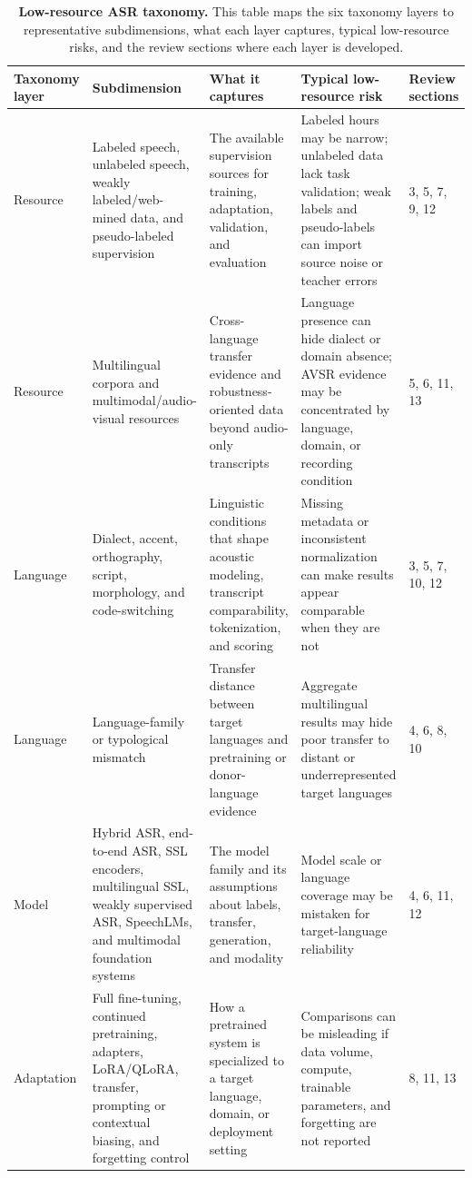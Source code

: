 \documentclass[pdflatex,sn-basic,iicol]{sn-jnl}
\theoremstyle{thmstyleone}
\theoremstyle{thmstyletwo}
\theoremstyle{thmstylethree}
\begin{document}
\begin{table}[htbp]
\setcounter{table}{0}
\small
\centering
\caption{\textbf{Low-resource ASR taxonomy.} This table maps the six taxonomy layers to representative subdimensions, what each layer captures, typical low-resource risks, and the review sections where each layer is developed.}
\label{tab:1}
\begin{tabularx}{\textwidth}{YYYYY}
\toprule
\textbf{Taxonomy layer} & \textbf{Subdimension} & \textbf{What it captures} & \textbf{Typical low-resource risk} & \textbf{Review sections} \\
\midrule
Resource & Labeled speech, unlabeled speech, weakly labeled/web-mined data, and pseudo-labeled supervision & The available supervision sources for training, adaptation, validation, and evaluation & Labeled hours may be narrow; unlabeled data lack task validation; weak labels and pseudo-labels can import source noise or teacher errors & 3, 5, 7, 9, 12 \\
Resource & Multilingual corpora and multimodal/audio-visual resources & Cross-language transfer evidence and robustness-oriented data beyond audio-only transcripts & Language presence can hide dialect or domain absence; AVSR evidence may be concentrated by language, domain, or recording condition & 5, 6, 11, 13 \\
Language & Dialect, accent, orthography, script, morphology, and code-switching & Linguistic conditions that shape acoustic modeling, transcript comparability, tokenization, and scoring & Missing metadata or inconsistent normalization can make results appear comparable when they are not & 3, 5, 7, 10, 12 \\
Language & Language-family or typological mismatch & Transfer distance between target languages and pretraining or donor-language evidence & Aggregate multilingual results may hide poor transfer to distant or underrepresented target languages & 4, 6, 8, 10 \\
Model & Hybrid ASR, end-to-end ASR, SSL encoders, multilingual SSL, weakly supervised ASR, SpeechLMs, and multimodal foundation systems & The model family and its assumptions about labels, transfer, generation, and modality & Model scale or language coverage may be mistaken for target-language reliability & 4, 6, 11, 12 \\
Adaptation & Full fine-tuning, continued pretraining, adapters, LoRA/QLoRA, transfer, prompting or contextual biasing, and forgetting control & How a pretrained system is specialized to a target language, domain, or deployment setting & Comparisons can be misleading if data volume, compute, trainable parameters, and forgetting are not reported & 8, 11, 13 \\

\end{tabularx}
\end{table}
\end{document}
